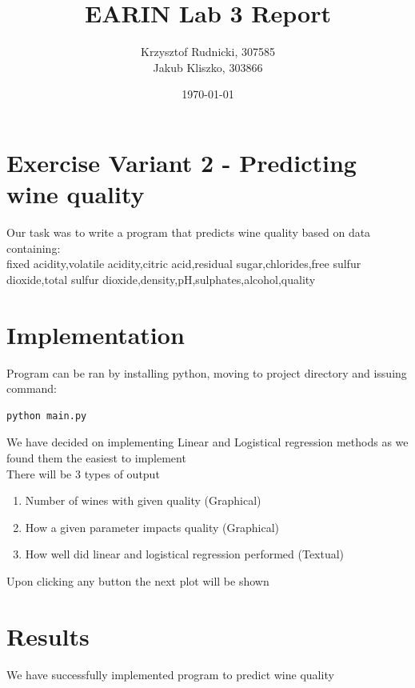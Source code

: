\documentclass{article}[12pt]
\title{EARIN Lab 3 Report}
\author{Krzysztof Rudnicki, 307585 \\ Jakub Kliszko, 303866  }
\date{\today}
\begin{document}
\maketitle
\section{Exercise Variant 2 - Predicting wine quality}
Our task was to write a program that predicts wine quality based on data containing: \\
fixed acidity,volatile acidity,citric acid,residual sugar,chlorides,free sulfur dioxide,total sulfur dioxide,density,pH,sulphates,alcohol,quality


\section{Implementation}
Program can be ran by installing python, moving to project directory and issuing command:
\begin{lstlisting}[language=bash]
python main.py
\end{lstlisting}
We have decided on implementing Linear and Logistical regression methods as we found them the easiest to implement \\  
There will be 3 types of output \\ 
\begin{enumerate}
    \item Number of wines with given quality (Graphical)
    \item How a given parameter impacts quality (Graphical)
    \item How well did linear and logistical regression performed (Textual)
\end{enumerate}
Upon clicking any button the next plot will be shown
\section{Results}
We have successfully implemented program to predict wine quality \\ 
\end{document}

